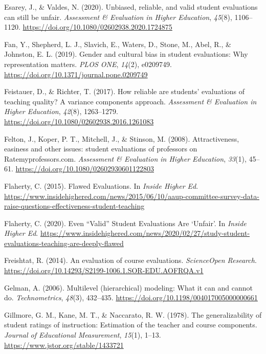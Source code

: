 \documentclass[
  man]{apa7}
\newlength{\cslhangindent}
\newlength{\cslentryspacingunit} %
\newenvironment{CSLReferences}[2] %
 {%
  \setlength{\parindent}{0pt}
  \ifodd #1
  \let\oldpar\par
  \def\par{\hangindent=\cslhangindent\oldpar}
  \fi
  \setlength{\parskip}{#2\cslentryspacingunit}
 }%
 {}
\begin{document}
\begin{CSLReferences}{1}{0}
\leavevmode{}%
Esarey, J., \& Valdes, N. (2020). Unbiased, reliable, and valid student evaluations can still be unfair. \emph{Assessment \& Evaluation in Higher Education}, \emph{45}(8), 1106--1120. \url{https://doi.org/10.1080/02602938.2020.1724875}

\leavevmode{}%
Fan, Y., Shepherd, L. J., Slavich, E., Waters, D., Stone, M., Abel, R., \& Johnston, E. L. (2019). Gender and cultural bias in student evaluations: Why representation matters. \emph{PLOS ONE}, \emph{14}(2), e0209749. \url{https://doi.org/10.1371/journal.pone.0209749}

\leavevmode{}%
Feistauer, D., \& Richter, T. (2017). How reliable are students{'} evaluations of teaching quality? A variance components approach. \emph{Assessment \& Evaluation in Higher Education}, \emph{42}(8), 1263--1279. \url{https://doi.org/10.1080/02602938.2016.1261083}

\leavevmode{}%
Felton, J., Koper, P. T., Mitchell, J., \& Stinson, M. (2008). Attractiveness, easiness and other issues: student evaluations of professors on Ratemyprofessors.com. \emph{Assessment \& Evaluation in Higher Education}, \emph{33}(1), 45--61. \url{https://doi.org/10.1080/02602930601122803}

\leavevmode{}%
Flaherty, C. (2015). Flawed {Evaluations}. In \emph{Inside Higher Ed}. \url{https://www.insidehighered.com/news/2015/06/10/aaup-committee-survey-data-raise-questions-effectiveness-student-teaching}

\leavevmode{}%
Flaherty, C. (2020). Even {``{Valid}''} {Student} {Evaluations} {Are} `{Unfair}'. In \emph{Inside Higher Ed}. \url{https://www.insidehighered.com/news/2020/02/27/study-student-evaluations-teaching-are-deeply-flawed}

\leavevmode{}%
Freishtat, R. (2014). An evaluation of course evaluations. \emph{ScienceOpen Research}. \url{https://doi.org/10.14293/S2199-1006.1.SOR-EDU.AOFRQA.v1}

\leavevmode{}%
Gelman, A. (2006). Multilevel (hierarchical) modeling: What it can and cannot do. \emph{Technometrics}, \emph{48}(3), 432--435. \url{https://doi.org/10.1198/004017005000000661}

\leavevmode{}%
Gillmore, G. M., Kane, M. T., \& Naccarato, R. W. (1978). The generalizability of student ratings of instruction: Estimation of the teacher and course components. \emph{Journal of Educational Measurement}, \emph{15}(1), 1--13. \url{https://www.jstor.org/stable/1433721}


\end{CSLReferences}
\end{document}
